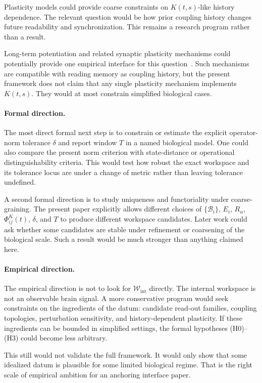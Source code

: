 \documentclass[12pt]{article}
\theoremstyle{definition}
\theoremstyle{remark}
\newcommand{\Wint}{\mathcal W_{\mathrm{int}}}
\begin{document}
Plasticity models could provide coarse constraints on \(K(t,s)\)-like
history dependence. The relevant question would be how prior coupling
history changes future readability and synchronization. This remains a
research program rather than a result.

Long-term potentiation and related synaptic plasticity mechanisms could
potentially provide one empirical interface for this question~\cite{BlissLomo1973,BlissCollingridge1993}.
Such mechanisms are
compatible with reading memory as coupling history, but the present
framework does not claim that any single plasticity mechanism implements
\(K(t,s)\). They would at most constrain simplified biological cases.

\paragraph{Formal direction.}
The most direct formal next step is to constrain or estimate the explicit
operator-norm tolerance \(\delta\) and report window \(T\) in a named
biological model. One could also compare the present norm criterion with
state-distance or operational distinguishability criteria. This would
test how robust the exact workspace and its tolerance locus are under a
change of metric rather than leaving tolerance undefined.

A second formal direction is to study uniqueness and functoriality under
coarse-graining. The present paper explicitly allows different choices
of \(\{\mathcal B_i\}\), \(E_i\), \(R_\alpha\),
\(\Phi_{ij}^{K}(t)\), \(\delta\), and \(T\) to produce different
workspace candidates. Later work could ask whether some candidates are
stable under refinement or coarsening of the biological scale. Such a
result would be much stronger than anything claimed here.

\paragraph{Empirical direction.}
The empirical direction is not to look for \(\Wint\) directly. The
internal workspace is not an observable brain signal. A more conservative
program would seek constraints on the ingredients of the datum:
candidate read-out families, coupling topologies, perturbation
sensitivity, and history-dependent plasticity. If these ingredients can
be bounded in simplified settings, the formal hypotheses (H0)--(H3)
could become less arbitrary.

This still would not validate the full framework. It would only show
that some idealized datum is plausible for some limited biological
regime. That is the right scale of empirical ambition for an anchoring
interface paper.
\end{document}
